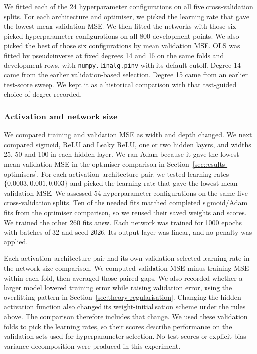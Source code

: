 We fitted each of the 24 hyperparameter configurations on all five cross-validation splits.
For each architecture and optimiser, we picked the learning rate that gave
the lowest mean validation MSE. We then fitted the networks with those
six picked hyperparameter configurations on all 800 development points. We also picked the best of those six configurations by mean validation
MSE. OLS was fitted by pseudoinverse
at fixed degrees 14 and 15 on the same folds and development rows, with
\nolinkurl{numpy.linalg.pinv} with its default cutoff.
Degree 14 came from the earlier validation-based selection. Degree 15 came from an earlier
test-score sweep. We kept it as a historical comparison with that
test-guided choice of degree recorded.

\subsubsection{Activation and network size}
We compared training and validation MSE as width and depth changed. We next compared sigmoid, ReLU and Leaky ReLU, one or two hidden layers,
and widths 25, 50 and 100 in each hidden layer. We ran Adam because it gave the lowest mean validation MSE in the
optimiser comparison in Section~\ref{sec:results-optimisers}. For each activation--architecture
pair, we tested learning rates $\{0.0003,0.001,0.003\}$ and picked the learning rate
that gave the lowest mean validation MSE. We assessed 54 hyperparameter configurations on the same five cross-validation splits.
Ten of the needed fits matched completed sigmoid/Adam fits from the
optimiser comparison, so we reused their saved weights and scores.
We trained the other 260 fits anew. Each network was trained for 1000
epochs with batches of 32 and seed 2026. Its output layer was linear,
and no penalty was applied.

Each activation--architecture pair had its own validation-selected
learning rate in the network-size comparison. We computed validation MSE
minus training MSE within each fold, then averaged those paired gaps.
We also recorded whether a larger model lowered training error while
raising validation error, using the overfitting pattern in
Section~\ref{sec:theory-regularisation}. Changing the hidden activation function also changed its weight-initialisation
scheme under the rules above. The comparison therefore includes that
change. We used these validation folds to pick the learning rates, so
their scores describe performance on the validation sets used for hyperparameter selection.
No test scores or explicit bias--variance decomposition were produced in
this experiment.

